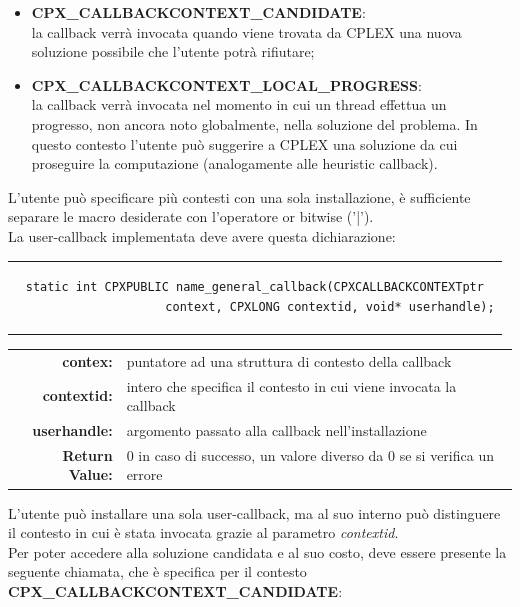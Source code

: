 \begin{itemize}
\item{\textbf{CPX\_CALLBACKCONTEXT\_CANDIDATE}:\\la callback verrà invocata quando viene trovata da CPLEX una nuova soluzione possibile che l'utente potrà rifiutare;}
\item{\textbf{CPX\_CALLBACKCONTEXT\_LOCAL\_PROGRESS}: \\la callback verrà invocata nel momento in cui un thread effettua un progresso, non ancora noto globalmente, nella soluzione del problema. In questo contesto l'utente può suggerire a CPLEX una soluzione da cui proseguire la computazione (analogamente alle heuristic callback).}\\
\end{itemize}
L'utente può specificare più contesti con una sola installazione, è sufficiente separare le macro desiderate con l'operatore or bitwise ('|').\\
La user-callback implementata deve avere questa dichiarazione:
\begin{center}
\begin{tabular}{c}
\begin{lstlisting}[linewidth=350pt, basicstyle=\footnotesize\sffamily,]    
static int CPXPUBLIC name_general_callback(CPXCALLBACKCONTEXTptr
                     context, CPXLONG contextid, void* userhandle);
\end{lstlisting}
\end{tabular}
\end{center}
\begin{table}[h]
\centering
\begin{tabular}{rl}
\textbf{contex:} & {puntatore ad una struttura di contesto della callback}\\
\textbf{contextid:} & {intero che specifica il contesto in cui viene invocata la callback}\\
\textbf{userhandle:} & {argomento passato alla callback nell'installazione}\\
\textbf{Return Value:} & {0 in caso di successo, un valore diverso da 0 se si verifica un errore}\\
\end{tabular}
\end{table}
L'utente può installare una sola user-callback, ma al suo interno può distinguere il contesto in cui è stata invocata grazie al parametro \textit{contextid}.\\
Per poter accedere alla soluzione candidata e al suo costo, deve essere presente la seguente chiamata, che è specifica per il contesto \textbf{CPX\_CALLBACKCONTEXT\_CANDIDATE}:
